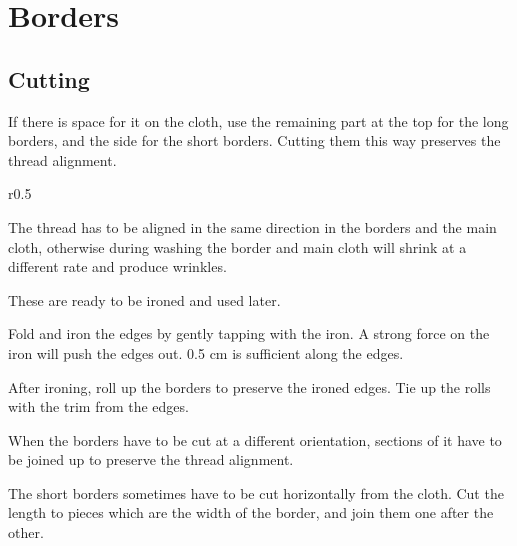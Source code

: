 \chapter{Borders}

\section{Cutting}

If there is space for it on the cloth, use the remaining part at the top
for the long borders, and the side for the short borders. Cutting them
this way preserves the thread alignment.

\setlength{\nextPhotoWidth}{0.5\textwidth}

\begin{wrapfigure}{r}{0.5\textwidth}


\end{wrapfigure}

The thread has to be aligned in the same direction in the borders and
the main cloth, otherwise during washing the border and main cloth will
shrink at a different rate and produce wrinkles.

These are ready to be ironed and used later.

Fold and iron the edges by gently tapping with the iron. A strong force
on the iron will push the edges out. 0.5 cm is sufficient along the
edges.

After ironing, roll up the borders to preserve the ironed edges. Tie up
the rolls with the trim from the edges.

\setlength{\nextPhotoWidth}{0.5\textwidth}


\clearpage

When the borders have to be cut at a different orientation, sections of
it have to be joined up to preserve the thread alignment.

The short borders sometimes have to be cut horizontally from the cloth.
Cut the length to pieces which are the width of the border, and join
them one after the other.


\setlength{\nextPhotoWidth}{0.9\textwidth}


